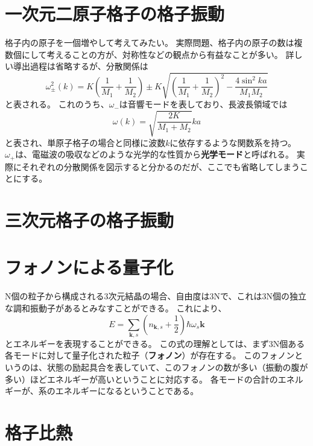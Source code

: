 \documentclass[a4paper]{jsreport}
\begin{document}
        \section{一次元二原子格子の格子振動}
            格子内の原子を一個増やして考えてみたい。
            実際問題、格子内の原子の数は複数個にして考えることの方が、対称性などの観点から有益なことが多い。
            詳しい導出過程は省略するが、分散関係は
            \begin{equation}
                \omega_{\pm}^2(k) = K \left(\frac{1}{M_1} + \frac{1}{M_2} \right) \pm K \sqrt{\left(\frac{1}{M_1} + \frac{1}{M_2} \right)^2 - \frac{4\sin^2{ka}}{M_1M_2}}
            \end{equation}
            と表される。
            これのうち、$\omega_-$は音響モードを表しており、長波長領域では
            \begin{equation}
                \omega(k) = \sqrt{\frac{2K}{M_1 + M_2}}ka
            \end{equation}
            と表され、単原子格子の場合と同様に波数$k$に依存するような関数系を持つ。
            $\omega_+$は、電磁波の吸収などのような光学的な性質から\textbf{光学モード}と呼ばれる。
            実際にそれぞれの分散関係を図示すると分かるのだが、ここでも省略してしまうことにする。

        \section{三次元格子の格子振動}
        \section{フォノンによる量子化}
            N個の粒子から構成される3次元結晶の場合、自由度は3Nで、これは3N個の独立な調和振動子があるとみなすことができる。
            これにより、
            \begin{equation}
                E = \sum_{\boldsymbol{k}, s} \left(n_{\boldsymbol{k},s} + \frac{1}{2}\right) \hbar \omega_s{\boldsymbol{k}}
            \end{equation}
            とエネルギーを表現することができる。
            この式の理解としては、まず3N個ある各モードに対して量子化された粒子（\textbf{フォノン}）が存在する。
            このフォノンというのは、状態の励起具合を表していて、このフォノンの数が多い（振動の腹が多い）ほどエネルギーが高いということに対応する。
            各モードの合計のエネルギーが、系のエネルギーになるということである。

        \section{格子比熱}
\end{document}
